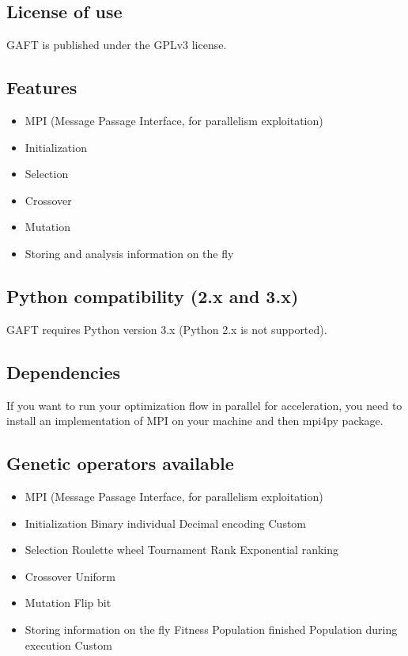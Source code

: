 \documentclass{article}
\begin{document}
	\subsection{License of use}
	GAFT is published under the GPLv3 license.
	\subsection{Features}
	\begin{itemize}
		\item MPI (Message Passage Interface, for parallelism exploitation)
		\item Initialization
		\item Selection
		\item Crossover
		\item Mutation
		\item Storing and analysis information on the fly
	\end{itemize}
	\subsection{Python compatibility (2.x and 3.x)}
	GAFT requires Python version 3.x (Python 2.x is not supported).
	\subsection{Dependencies}
	If you want to run your optimization flow in parallel for acceleration, you need to install an implementation of MPI on your machine and then mpi4py package.
	\subsection{Genetic operators available}
	\begin{itemize}
		\item MPI (Message Passage Interface, for parallelism exploitation)
		\item Initialization
		\subitem Binary individual
		\subitem Decimal encoding
		\subitem Custom
		\item Selection
		\subitem Roulette wheel 
		\subitem Tournament
		\subitem Rank
		\subitem Exponential ranking 
		\item Crossover
		\subitem Uniform 
		\item Mutation
		\subitem Flip bit
		\item Storing information on the fly
		\subitem Fitness
		\subitem Population finished
		\subitem Population during execution
		\subitem Custom
	\end{itemize}
\end{document}
